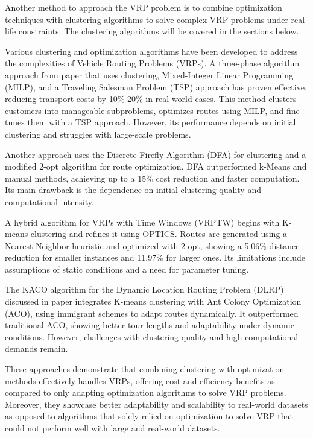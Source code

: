 Another method to approach the VRP problem is to combine optimization techniques with clustering algorithms to solve complex VRP problems under real-life constraints. The clustering algorithms will be covered in the sections below.

Various clustering and optimization algorithms have been developed to address the complexities of Vehicle Routing Problems (VRPs). A three-phase algorithm approach from paper \cite{3_phase_cluster} that uses clustering, Mixed-Integer Linear Programming (MILP), and a Traveling Salesman Problem (TSP) approach has proven effective, reducing transport costs by 10\%-20\% in real-world cases. This method clusters customers into manageable subproblems, optimizes routes using MILP, and fine-tunes them with a TSP approach. However, its performance depends on initial clustering and struggles with large-scale problems.

Another approach \cite{firefly} uses the Discrete Firefly Algorithm (DFA) for clustering and a modified 2-opt algorithm for route optimization. DFA outperformed k-Means and manual methods, achieving up to a 15\% cost reduction and faster computation. Its main drawback is the dependence on initial clustering quality and computational intensity.

A hybrid algorithm \cite{hybrid_kmeans} for VRPs with Time Windows (VRPTW) begins with K-means clustering and refines it using OPTICS. Routes are generated using a Nearest Neighbor heuristic and optimized with 2-opt, showing a 5.06\% distance reduction for smaller instances and 11.97\% for larger ones. Its limitations include assumptions of static conditions and a need for parameter tuning.

The KACO algorithm for the Dynamic Location Routing Problem (DLRP) discussed in paper \cite{aco_dp_cluster} integrates K-means clustering with Ant Colony Optimization (ACO), using immigrant schemes to adapt routes dynamically. It outperformed traditional ACO, showing better tour lengths and adaptability under dynamic conditions. However, challenges with clustering quality and high computational demands remain.

These approaches demonstrate that combining clustering with optimization methods effectively handles VRPs, offering cost and efficiency benefits as compared to only adapting optimization algorithms to solve VRP problems. Moreover, they showcase better adaptability and scalability to real-world datasets as opposed to algorithms that solely relied on optimization to solve VRP that could not perform well with large and real-world datasets.


